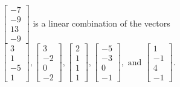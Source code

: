 \begin{exercise}
\begin{exerciseStatement}
  \end{exerciseStatement}
  \begin{exerciseAnswer}
   \(\left[\begin{array}{c}
-7 \\
-9 \\
13 \\
-9
\end{array}\right]\) 
  	 is  
	a linear combination of the vectors \(\left[\begin{array}{c}
3 \\
1 \\
-5 \\
1
\end{array}\right] , \left[\begin{array}{c}
3 \\
-2 \\
0 \\
-2
\end{array}\right] , \left[\begin{array}{c}
2 \\
1 \\
1 \\
1
\end{array}\right] , \left[\begin{array}{c}
-5 \\
-3 \\
0 \\
-1
\end{array}\right] , \text{ and } \left[\begin{array}{c}
1 \\
-1 \\
4 \\
-1
\end{array}\right]\).

	
  


  \end{exerciseAnswer}
\end{exercise}